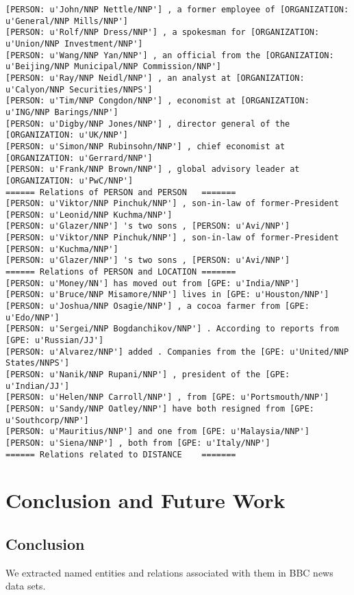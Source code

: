 \documentclass[12pt]{report}
\begin{document}
\begin{scriptsize}
\begin{verbatim}
[PERSON: u'John/NNP Nettle/NNP'] , a former employee of [ORGANIZATION: u'General/NNP Mills/NNP']
[PERSON: u'Rolf/NNP Dress/NNP'] , a spokesman for [ORGANIZATION: u'Union/NNP Investment/NNP']
[PERSON: u'Wang/NNP Yan/NNP'] , an official from the [ORGANIZATION: u'Beijing/NNP Municipal/NNP Commission/NNP']
[PERSON: u'Ray/NNP Neidl/NNP'] , an analyst at [ORGANIZATION: u'Calyon/NNP Securities/NNPS']
[PERSON: u'Tim/NNP Congdon/NNP'] , economist at [ORGANIZATION: u'ING/NNP Barings/NNP']
[PERSON: u'Digby/NNP Jones/NNP'] , director general of the [ORGANIZATION: u'UK/NNP']
[PERSON: u'Simon/NNP Rubinsohn/NNP'] , chief economist at [ORGANIZATION: u'Gerrard/NNP']
[PERSON: u'Frank/NNP Brown/NNP'] , global advisory leader at [ORGANIZATION: u'PwC/NNP']
====== Relations of PERSON and PERSON	=======
[PERSON: u'Viktor/NNP Pinchuk/NNP'] , son-in-law of former-President [PERSON: u'Leonid/NNP Kuchma/NNP']
[PERSON: u'Glazer/NNP'] 's two sons , [PERSON: u'Avi/NNP']
[PERSON: u'Viktor/NNP Pinchuk/NNP'] , son-in-law of former-President [PERSON: u'Kuchma/NNP']
[PERSON: u'Glazer/NNP'] 's two sons , [PERSON: u'Avi/NNP']
====== Relations of PERSON and LOCATION	=======
[PERSON: u'Money/NN'] has moved out from [GPE: u'India/NNP']
[PERSON: u'Bruce/NNP Misamore/NNP'] lives in [GPE: u'Houston/NNP']
[PERSON: u'Joshua/NNP Osagie/NNP'] , a cocoa farmer from [GPE: u'Edo/NNP']
[PERSON: u'Sergei/NNP Bogdanchikov/NNP'] . According to reports from [GPE: u'Russian/JJ']
[PERSON: u'Alvarez/NNP'] added . Companies from the [GPE: u'United/NNP States/NNPS']
[PERSON: u'Nanik/NNP Rupani/NNP'] , president of the [GPE: u'Indian/JJ']
[PERSON: u'Helen/NNP Carroll/NNP'] , from [GPE: u'Portsmouth/NNP']
[PERSON: u'Sandy/NNP Oatley/NNP'] have both resigned from [GPE: u'Southcorp/NNP']
[PERSON: u'Mauritius/NNP'] and one from [GPE: u'Malaysia/NNP']
[PERSON: u'Siena/NNP'] , both from [GPE: u'Italy/NNP']
====== Relations related to DISTANCE	=======
\end{verbatim}
\end{scriptsize}



\chapter{Conclusion and Future Work}
\section{Conclusion}
\par We extracted named entities and relations associated with them in BBC news data sets.
\end{document}
